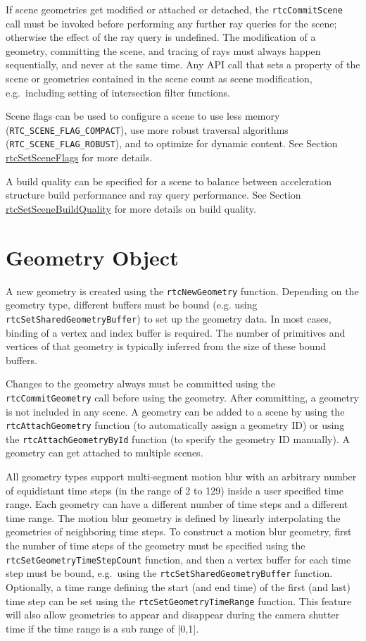 If scene geometries get modified or attached or detached, the
\texttt{rtcCommitScene} call must be invoked before performing any
further ray queries for the scene; otherwise the effect of the ray query
is undefined. The modification of a geometry, committing the scene, and
tracing of rays must always happen sequentially, and never at the same
time. Any API call that sets a property of the scene or geometries
contained in the scene count as scene modification, e.g.~including
setting of intersection filter functions.

Scene flags can be used to configure a scene to use less memory
(\texttt{RTC\_SCENE\_FLAG\_COMPACT}), use more robust traversal
algorithms (\texttt{RTC\_SCENE\_FLAG\_ROBUST}), and to optimize for
dynamic content. See Section
\hyperref[rtcsetsceneflags]{rtcSetSceneFlags} for more details.

A build quality can be specified for a scene to balance between
acceleration structure build performance and ray query performance. See
Section \hyperref[rtcsetscenebuildquality]{rtcSetSceneBuildQuality} for
more details on build quality.

\section{Geometry Object}\label{geometry-object}

A new geometry is created using the \texttt{rtcNewGeometry} function.
Depending on the geometry type, different buffers must be bound (e.g.
using \texttt{rtcSetSharedGeometryBuffer}) to set up the geometry data.
In most cases, binding of a vertex and index buffer is required. The
number of primitives and vertices of that geometry is typically inferred
from the size of these bound buffers.

Changes to the geometry always must be committed using the
\texttt{rtcCommitGeometry} call before using the geometry. After
committing, a geometry is not included in any scene. A geometry can be
added to a scene by using the \texttt{rtcAttachGeometry} function (to
automatically assign a geometry ID) or using the
\texttt{rtcAttachGeometryById} function (to specify the geometry ID
manually). A geometry can get attached to multiple scenes.

All geometry types support multi-segment motion blur with an arbitrary
number of equidistant time steps (in the range of 2 to 129) inside a
user specified time range. Each geometry can have a different number of
time steps and a different time range. The motion blur geometry is
defined by linearly interpolating the geometries of neighboring time
steps. To construct a motion blur geometry, first the number of time
steps of the geometry must be specified using the
\texttt{rtcSetGeometryTimeStepCount} function, and then a vertex buffer
for each time step must be bound, e.g.~using the
\texttt{rtcSetSharedGeometryBuffer} function. Optionally, a time range
defining the start (and end time) of the first (and last) time step can
be set using the \texttt{rtcSetGeometryTimeRange} function. This feature
will also allow geometries to appear and disappear during the camera
shutter time if the time range is a sub range of {[}0,1{]}.

